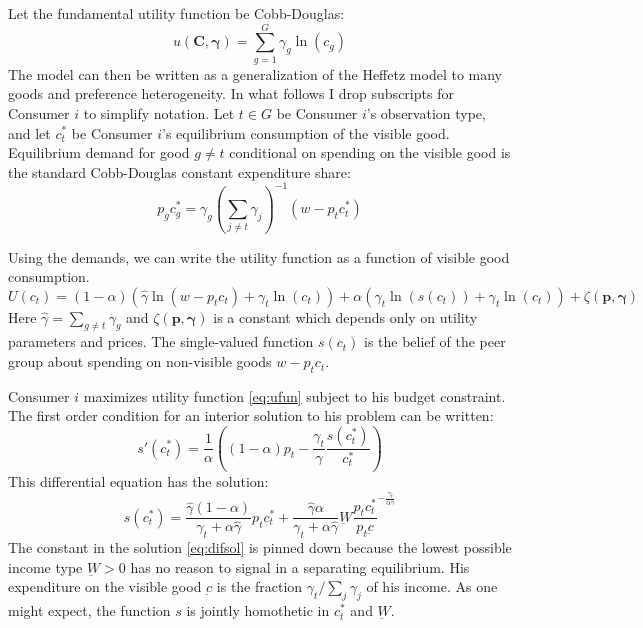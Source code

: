 \documentclass[12pt]{article}
\begin{document}
Let the fundamental utility function be Cobb-Douglas:
\[u(\mathbf{C}, \boldsymbol{\gamma}) = \sum_{g=1}^{G} \gamma_g \ln(c_g)\]
The model can then be written as a generalization of the Heffetz model to many goods and preference heterogeneity.\footnotemark{}
In what follows I drop subscripts for Consumer $i$ to simplify notation. Let $t \in G$ be Consumer $i$'s observation type, and let $c_{t}^*$ be Consumer $i$'s equilibrium consumption of the visible good.  Equilibrium demand for good $g\neq t$ conditional on spending on the visible good is the standard Cobb-Douglas constant expenditure share:
\begin{equation}
    \label{eq:opt_cobb}
    p_g c_g^* = \gamma_g\left(\sum_{j\neq t} \gamma_j\right)^{-1}\left(w-p_t c_t^* \right)
\end{equation}

Using the demands, we can write the utility function as a function of visible good consumption.
\begin{equation}
    \label{eq:ufun}
    U(c_t) = (1-\alpha) \left(\hat{\gamma} \ln \left(w-p_t c_t\right) + \gamma_t \ln \left(c_t \right)\right) + \alpha \left(\gamma_t \ln \left(s(c_t)\right) + \gamma_t \ln \left(c_t\right) \right) + \zeta(\mathbf{p},\boldsymbol{\gamma})
\end{equation}
Here $\hat{\gamma} = \sum_{g\neq t} \gamma_g$ and $\zeta(\mathbf{p},\boldsymbol{\gamma})$ is a constant which depends only on utility parameters and prices.  The single-valued function $s(c_t)$ is the belief of the peer group about spending on non-visible goods $w-p_t c_t$. 

Consumer $i$ maximizes utility function \eqref{eq:ufun} subject to his budget constraint.  The first order condition for an interior solution to his problem can be written:
\begin{equation}
	\label{foc}
s'(c_t^*) = \frac{1}{\alpha}\left( \left( 1-\alpha\right) p_t - \frac{\gamma_t}{\hat{\gamma}}\frac{s(c_t^*)}{c_t^*}\right)
\end{equation}
This differential equation has the solution:
\begin{equation}
	\label{eq:difsol}
    s(c_t^*) = \frac{\hat{\gamma}\left(1-\alpha\right)}{\gamma_t +\alpha \hat{\gamma}} p_t c_t^* +  \frac{\hat{\gamma} \alpha }{\gamma_t + \alpha \hat{\gamma}} \underbar{W}\frac{p_t c_t^*}{p_t \underbar{c}}^{-\frac{\gamma_t}{\alpha \hat{\gamma}}}
\end{equation}
The constant in the solution \eqref{eq:difsol} is pinned down because the lowest possible income type $\underbar{W} > 0$ has no reason to signal in a separating equilibrium.  His expenditure on the visible good $\underbar{c}$ is the fraction $\gamma_t / \sum_j \gamma_j$ of his income.  As one might expect, the function $s$ is jointly homothetic in $c_t^*$ and $\underbar{W}$.
\end{document}
